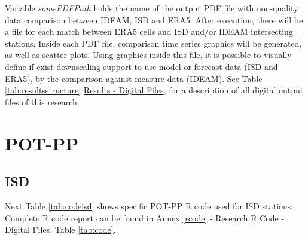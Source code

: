 \documentclass[12pt,oneside]{reedthesis}
\begin{document}
Variable \emph{somePDFPath} holds the name of the output PDF file with non-quality data comparison between IDEAM, ISD and ERA5. After execution, there will be a file for each match between ERA5 cells and ISD and/or IDEAM intersecting stations. Inside each PDF file, comparison time series graphics will be generated, as well as scatter plots. Using graphics inside this file, it is possible to visually define if exist downscaling support to use model or forecast data (ISD and ERA5), by the comparison against measure data (IDEAM). See Table \ref{tab:resultsstructure} \protect\hyperlink{results}{Results - Digital Files}, for a description of all digital output files of this research.

\hypertarget{pot-pp-1}{%
\section{POT-PP}\label{pot-pp-1}}

\hypertarget{isd-1}{%
\subsection{ISD}\label{isd-1}}

Next Table \ref{tab:codeisd} shows specific POT-PP R code used for ISD stations. Complete R code report can be found in Annex \ref{rcode} - Research R Code - Digital Files, Table \ref{tab:code}.
\end{document}
